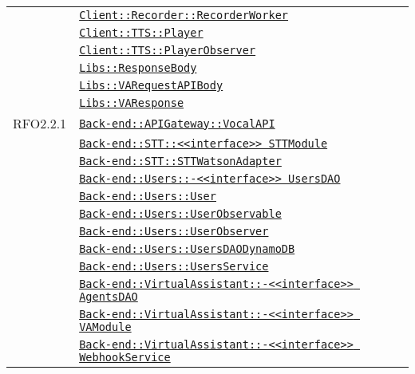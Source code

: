 \begin{longtable}{|>{\centering}m{3cm}|m{10cm}<{\centering}|}
& \hyperref[Client::Recorder::RecorderWorker]{\texttt{Client::Recorder::RecorderWorker}}\\
& \hyperref[Client::TTS::Player]{\texttt{Client::TTS::Player}}\\
& \hyperref[Client::TTS::PlayerObserver]{\texttt{Client::TTS::PlayerObserver}}\\
& \hyperref[Libs::ResponseBody]{\texttt{Libs::ResponseBody}}\\
& \hyperref[Libs::VARequestAPIBody]{\texttt{Libs::VARequestAPIBody}}\\
& \hyperref[Libs::VAResponse]{\texttt{Libs::VAResponse}}\\ \hline

RFO2.2.1 & \hyperref[Back-end::APIGateway::VocalAPI]{\texttt{Back-end::APIGateway::VocalAPI}}\\
& \hyperref[Back-end::STT::<<interface>> STTModule]{\texttt{Back-end::STT::<<interface>> STTModule}}\\
& \hyperref[Back-end::STT::STTWatsonAdapter]{\texttt{Back-end::STT::STTWatsonAdapter}}\\
& \hyperref[Back-end::Users::<<interface>> UsersDAO]{\texttt{Back-end::Users::-\linebreak <<interface>> UsersDAO}}\\
& \hyperref[Back-end::Users::User]{\texttt{Back-end::Users::User}}\\
& \hyperref[Back-end::Users::UserObservable]{\texttt{Back-end::Users::UserObservable}}\\
& \hyperref[Back-end::Users::UserObserver]{\texttt{Back-end::Users::UserObserver}}\\
& \hyperref[Back-end::Users::UsersDAODynamoDB]{\texttt{Back-end::Users::UsersDAODynamoDB}}\\
& \hyperref[Back-end::Users::UsersService]{\texttt{Back-end::Users::UsersService}}\\
& \hyperref[Back-end::VirtualAssistant::<<interface>> AgentsDAO]{\texttt{Back-end::VirtualAssistant::-\linebreak <<interface>> AgentsDAO}}\\
& \hyperref[Back-end::VirtualAssistant::<<interface>> VAModule]{\texttt{Back-end::VirtualAssistant::-\linebreak <<interface>> VAModule}}\\
& \hyperref[Back-end::VirtualAssistant::<<interface>> WebhookService]{\texttt{Back-end::VirtualAssistant::-\linebreak <<interface>> WebhookService}}\\

\end{longtable}
